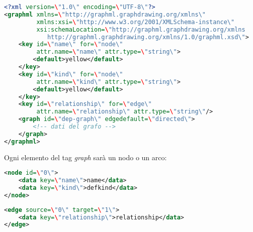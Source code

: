 \begin{lstlisting}[language=XML, caption=file GraphML]
<?xml version=\"1.0\" encoding=\"UTF-8\"?>
<graphml xmlns=\"http://graphml.graphdrawing.org/xmlns\"
         xmlns:xsi=\"http://www.w3.org/2001/XMLSchema-instance\"
         xsi:schemaLocation=\"http://graphml.graphdrawing.org/xmlns
            http://graphml.graphdrawing.org/xmlns/1.0/graphml.xsd\">
    <key id=\"name\" for=\"node\"
         attr.name=\"name\" attr.type=\"string\">
        <default>yellow</default>
    </key>
    <key id=\"kind\" for=\"node\"
         attr.name=\"kind\" attr.type=\"string\">
        <default>yellow</default>
    </key>
    <key id=\"relationship\" for=\"edge\"
         attr.name=\"relationship\" attr.type=\"string\"/>
    <graph id=\"dep-graph\" edgedefault=\"directed\">
        <!-- dati del grafo -->
    </graph>
</graphml>
\end{lstlisting}

Ogni elemento del tag \emph{graph} sar\`a un nodo o un arco:

\begin{lstlisting}[language=XML, caption=esempio di nodo]
<node id=\"0\">
    <data key=\"name\">name</data>
    <data key=\"kind\">defkind</data>
</node>
\end{lstlisting}

\begin{lstlisting}[language=XML, caption=esempio di arco]
<edge source=\"0\" target=\"1\">
    <data key=\"relationship\">relationship</data>
</edge>
\end{lstlisting}
